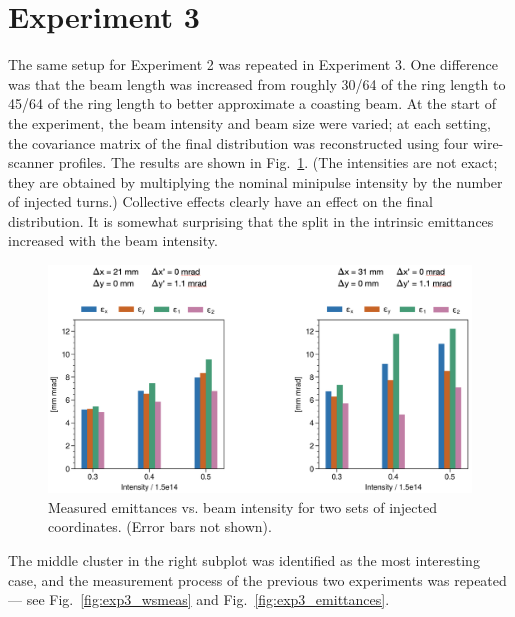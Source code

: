 \section{Experiment 3}

The same setup for Experiment 2 was repeated in Experiment 3. One difference was that the beam length was increased from roughly 30/64 of the ring length to 45/64 of the ring length to better approximate a coasting beam. At the start of the experiment, the beam intensity and beam size were varied; at each setting, the covariance matrix of the final distribution was reconstructed using four wire-scanner profiles. The results are shown in Fig.~\ref{fig:exp3_search}. (The intensities are not exact; they are obtained by multiplying the nominal minipulse intensity by the number of injected turns.) Collective effects clearly have an effect on the final distribution. It is somewhat surprising that the split in the intrinsic emittances increased with the beam intensity. 
%
\begin{figure}[!p]
    \centering
    \vspace*{1.0cm}
    \includegraphics[width=\textwidth]{Images/chapter5/exp3/search.png}
    \caption{Measured emittances vs. beam intensity for two sets of injected coordinates. (Error bars not shown).}
    \label{fig:exp3_search}
    \vspace*{1.0cm}
\end{figure}
%
The middle cluster in the right subplot was identified as the most interesting case, and the measurement process of the previous two experiments was repeated — see Fig.~\ref{fig:exp3_wsmeas} and Fig.~\ref{fig:exp3_emittances}.
%
